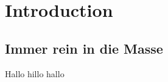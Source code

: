 \chapter{Introduction}\label{chap:introduction}

\section{Immer rein in die Masse}\label{sec:masse}
Hallo hillo hallo